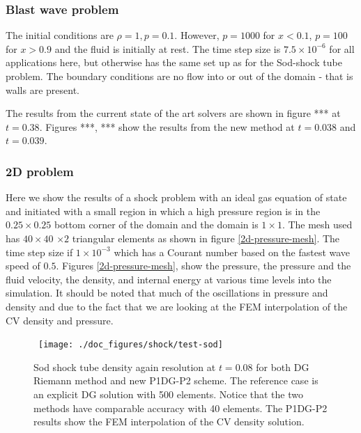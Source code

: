 \subsubsection{Blast wave problem} 


The initial conditions are $\rho=1, p=0.1$. 
However, $p=1000$ for $x< 0.1$, $p=100$ for $x> 0.9$ and the fluid 
is initially at rest. 
The time step size is $7.5\times10^{-6}$ for all applications 
here, but otherwise has the same set up as for the Sod-shock tube problem.
The boundary conditions are no flow into or out of the domain - that is 
walls are present. 

The results from the current state of the art solvers are shown 
in figure *** at $t=0.38$. Figures ***, *** show the results 
from the new method at $t=0.038$ and $t=0.039$. 



\subsubsection{2D problem}
Here we show the results of a shock problem with 
an ideal gas equation of state and initiated with 
a small region in which a high pressure region is 
in the $0.25\times0.25$ bottom corner of the 
domain and the domain is $1\times 1$. The 
mesh used has $40\times40$ $\times 2$ triangular elements 
as shown in figure \ref{2d-pressure-mesh}. 
The time step size if $1\times 10^{-3}$ which has a 
Courant number based on the fastest wave speed of $0.5$. 
Figures \ref{2d-pressure-mesh}, 
show the pressure, the pressure and the fluid velocity, 
the density, and internal energy at various time levels 
into the simulation. It should be noted that much of the oscillations 
in pressure and density and due to the fact that we are 
looking at the FEM interpolation of the CV density and pressure. 



\begin{figure}[H]
\vbox{
\hbox{
\hspace{-1.cm}
\texttt{[image: ./doc\_figures/shock/test-sod]}
}
\vspace{-0.cm}
\vspace{-0.cm}}
\label{sod-converg-density}
\caption{ Sod shock tube density again resolution at $t=0.08$ 
for both DG Riemann method and new P1DG-P2 scheme. 
The reference case is an explicit DG solution with 500 elements. 
Notice that the two methods 
have comparable accuracy with 40 elements. The 
P1DG-P2 results show the FEM interpolation of the CV density solution.}
\end{figure}



